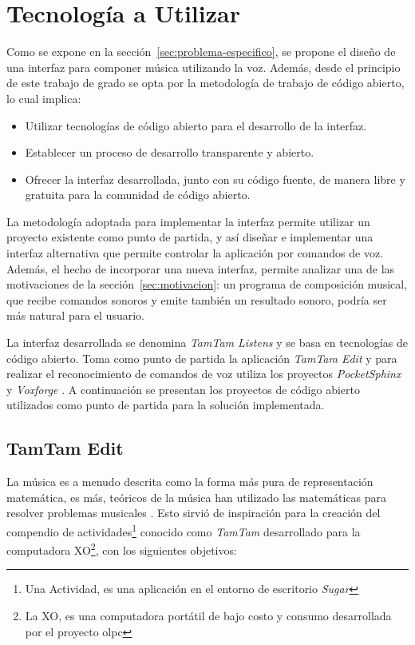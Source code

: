 
\section{Tecnolog\'ia a Utilizar}
\label{sec:tecnologia-utilizada}

Como se expone en la secci\'on~\ref{sec:problema-especifico}, se propone el dise\~no
de una interfaz para componer m\'usica utilizando la voz. Adem\'as, desde el principio de
este trabajo de grado se opta por la metodolog\'ia de trabajo
de c\'odigo abierto, lo cual implica: 

\begin{itemize}
    \item Utilizar tecnolog\'ias de c\'odigo abierto para el desarrollo de la interfaz.
    \item Establecer un proceso de desarrollo transparente y abierto.
    \item Ofrecer la interfaz desarrollada, junto con su c\'odigo fuente, de manera libre 
        y gratuita para la comunidad de c\'odigo abierto.
\end{itemize}

La metodolog\'ia adoptada para implementar la interfaz permite utilizar un proyecto
existente como punto de partida, y as\'i dise\~nar e implementar una interfaz alternativa que permite
controlar la aplicaci\'on por comandos de voz. Adem\'as,
el hecho de incorporar una nueva interfaz, permite analizar
una de las motivaciones de la secci\'on~\ref{sec:motivacion}: un programa de composici\'on
musical, que recibe comandos sonoros y emite tambi\'en un resultado sonoro, podr\'ia ser
m\'as natural para el usuario. 

La interfaz desarrollada se denomina \emph{TamTam Listens} y se basa en tecnolog\'ias de c\'odigo abierto.
Toma como punto de partida la aplicaci\'on \emph{TamTam Edit} y para realizar el reconocimiento de comandos
de voz utiliza los proyectos \emph{PocketSphinx} \cite{PocketSphinxHomePage} 
y \emph{Voxforge} \cite{Voxforge}.  A continuaci\'on se presentan los proyectos de c\'odigo abierto
utilizados como punto de partida para la soluci\'on implementada.

\subsection{TamTam Edit}
\label{sec:tamtam-edit}

La m\'usica es a menudo descrita como la forma m\'as pura de representaci\'on matem\'atica, es m\'as,
te\'oricos de la m\'usica han utilizado las matem\'aticas para resolver problemas musicales
\cite{TheSoundOfNumbers}. Esto sirvi\'o de inspiraci\'on para la creaci\'on del compendio de 
actividades\footnote{Una Actividad, es una aplicaci\'on en el entorno de escritorio \emph{Sugar}}
conocido como \emph{TamTam} desarrollado para la computadora XO\footnote{La XO, es una computadora 
port\'atil de bajo costo y consumo desarrollada por el proyecto \gls{olpc}},
con los siguientes objetivos:

